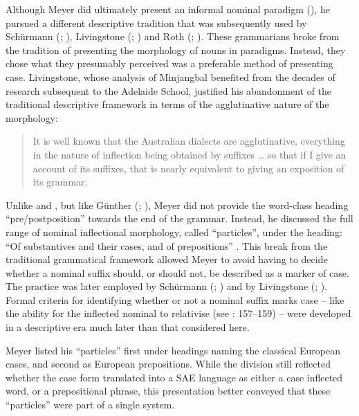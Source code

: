 Although Meyer did ultimately present an informal nominal paradigm (), he pursued a different descriptive tradition that was subsequently used by Schürmann (\citeyear{schurmann_vocabulary_1844}; ), Livingstone (\citeyear{Livingstone1892}; ) and Roth (\citeyear{Roth1897}; ). These grammarians broke from the tradition of presenting the morphology of nouns in paradigms. Instead, they chose what they presumably perceived was a preferable method of presenting case. Livingstone, whose analysis of Minjangbal benefited from the decades of research subsequent to the Adelaide School, justified his abandonment of the traditional descriptive framework in terms of the agglutinative nature of the morphology:

\begin{quote}
It is well known that the Australian dialects are agglutinative, everything in the nature of inflection being obtained by suffixes … so that if I give an account of its suffixes, that is nearly equivalent to giving an exposition of its grammar. \citep[3]{Livingstone1892}
\end{quote}

Unlike \citet{TeichelmannSchürmann1840} and \citet{Threlkeld1834}, but like Günther (\citeyear{gunther_native_1838}; \citeyear{gunther_lecture_1840}), Meyer did not provide the word-class heading “pre/postposition” towards the end of the grammar. Instead, he discussed the full range of nominal inflectional morphology, called ``particles'', under the heading: “Of substantives and their cases, and of prepositions” \citeyearpar[10]{meyer_vocabulary_1843}. This break from the traditional grammatical framework allowed Meyer to avoid having to decide whether a nominal suffix should, or should not, be described as a marker of case. The practice was later employed by Schürmann (\citeyear{schurmann_vocabulary_1844}; ) and by Livingstone (\citeyear[9--11]{Livingstone1892}; ). Formal criteria for identifying whether or not a nominal suffix marks case – like the ability for the inflected nominal to relativise (see \citealt{wilkins_mparntwe_1989}: 157--159) – were developed in a descriptive era much later than that considered here.

Meyer listed his “particles” \citeyearpar[10--17]{meyer_vocabulary_1843} first under headings naming the classical European cases, and second as European prepositions. While the division still reflected whether the case form translated into a SAE language as either a case inflected word, or a prepositional phrase, this presentation better conveyed that these “particles” were part of a single system.


